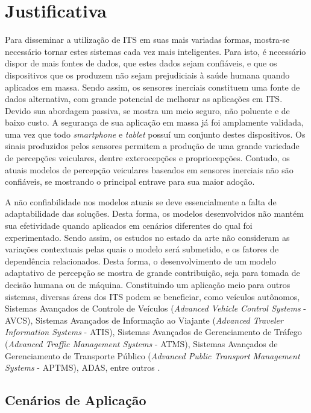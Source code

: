 \section{Justificativa}

Para disseminar a utilização de ITS em suas mais variadas formas, mostra-se necessário tornar estes sistemas cada vez mais inteligentes. Para isto, é necessário dispor de mais fontes de dados, que estes dados sejam confiáveis, e que os dispositivos que os produzem não sejam prejudiciais à saúde humana quando aplicados em massa. Sendo assim, os sensores inerciais constituem uma fonte de dados alternativa, com grande potencial de melhorar as aplicações em ITS. Devido sua abordagem passiva, se mostra um meio seguro, não poluente e de baixo custo. A segurança de sua aplicação em massa já foi amplamente validada, uma vez que todo \textit{smartphone} e \textit{tablet} possuí um conjunto destes dispositivos. Os sinais produzidos pelos sensores permitem a produção de uma grande variedade de percepções veiculares, dentre exterocepções e propriocepções. Contudo, os atuais modelos de percepção veiculares baseados em sensores inerciais não são confiáveis, se mostrando o principal entrave para sua maior adoção.

A não confiabilidade nos modelos atuais se deve essencialmente a falta de adaptabilidade das soluções. Desta forma, os modelos desenvolvidos não mantém sua efetividade quando aplicados em cenários diferentes do qual foi experimentado. Sendo assim, os estudos no estado da arte não consideram as variações contextuais pelas quais o modelo será submetido, e os fatores de dependência relacionados. Desta forma, o desenvolvimento de um modelo adaptativo de percepção se mostra de grande contribuição, seja para tomada de decisão humana ou de máquina. Constituindo um aplicação meio para outros sistemas, diversas áreas dos ITS podem se beneficiar, como veículos autônomos, Sistemas Avançados de Controle de Veículos (\textit{Advanced Vehicle Control Systems} - AVCS), Sistemas Avançados de Informação ao Viajante (\textit{Advanced Traveler Information Systems} - ATIS), Sistemas Avançados de Gerenciamento de Tráfego (\textit{Advanced Traffic Management Systems} - ATMS), Sistemas Avançados de Gerenciamento de Transporte Público (\textit{Advanced Public Transport Management Systems} - APTMS), ADAS, entre outros \cite{Zhang2011,Singh2015}.

\subsection{Cenários de Aplicação}

